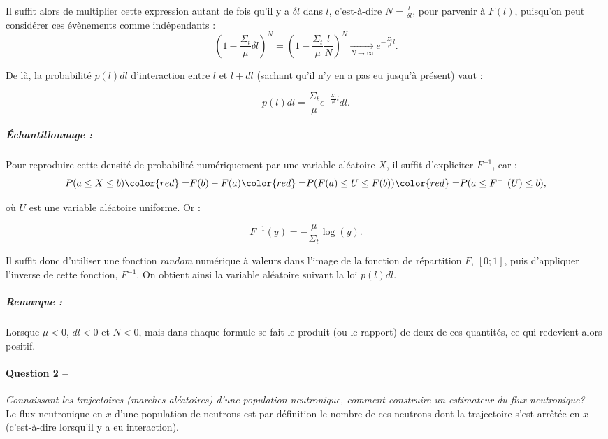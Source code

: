 \documentclass[11pt,a4paper]{article}
\newcommand{\question}[2]{\paragraph{Question #1 --}\hspace{-7pt}\textit{#2} \\}
\begin{document}
Il suffit alors de multiplier cette expression autant de fois qu'il y a $\delta l$ dans $l$, c'est-à-dire $N=\frac{l}{\delta l}$, pour parvenir à $F(l)$, puisqu'on peut considérer ces évènements comme indépendants : 
\begin{equation}
  \left(1-\frac{\Sigma_t}{\mu} \delta l\right)^N = \left(1-\frac{\Sigma_t}{\mu} \frac{l}{N}\right)^N  \xrightarrow[N \rightarrow \infty]{} e^{-\frac{\Sigma_t}{\mu} l} .
\end{equation}

De là, la probabilité $p(l) dl$ d'interaction entre $l$ et $l+dl$ (sachant qu'il n'y en a pas eu jusqu'à présent) vaut :

\begin{equation}
  p(l) dl = \frac{\Sigma_t}{\mu} e^{-\frac{\Sigma_t}{\mu} l} dl .
\end{equation}

\subparagraph{Échantillonnage :}

Pour reproduire cette densité de probabilité numériquement par une variable aléatoire $X$, il suffit d'expliciter $F^{-1}$, car :
\begin{equation}
  P(a\leq X\leq b) {\color{red}=} F(b) - F(a) {\color{red}=} P(F(a)\leq U\leq F(b)) {\color{red}=} P(a\leq F^{-1}(U)\leq b) ,
\end{equation}

où $U$ est une variable aléatoire uniforme. Or :

\begin{equation}
  F^{-1}(y) = -\frac{\mu}{\Sigma_t} \log(y) .
\end{equation}

Il suffit donc d'utiliser une fonction \textit{random} numérique à valeurs dans l'image de la fonction de répartition $F$, $[0;1]$, puis d'appliquer l'inverse de cette fonction, $F^{-1}$.
On obtient ainsi la variable aléatoire suivant la loi $p(l) dl$.

\subparagraph{Remarque :} Lorsque $\mu<0$, $dl<0$ et $N<0$, mais dans chaque formule se fait le produit (ou le rapport) de deux de ces quantités, ce qui redevient alors positif.

\question{2}{Connaissant les trajectoires (marches aléatoires) d'une population neutronique, comment construire un estimateur du flux neutronique?}

Le flux neutronique en $x$ d'une population de neutrons est par définition le nombre de ces neutrons dont la trajectoire s'est arrêtée en $x$ (c'est-à-dire lorsqu'il y a eu interaction).
\end{document}
